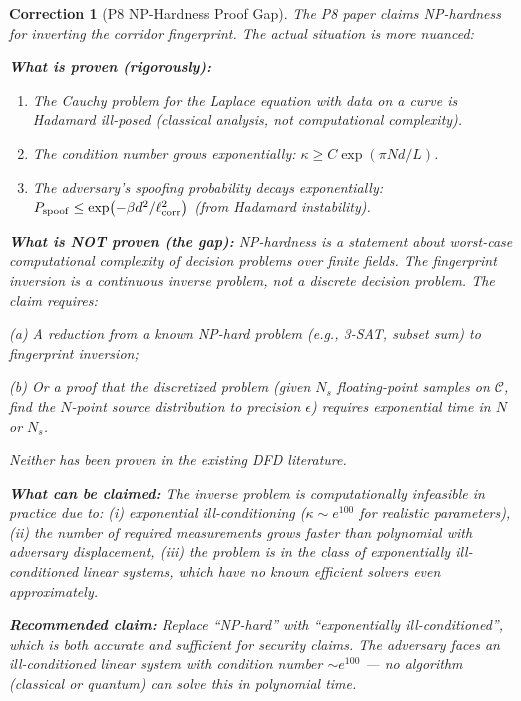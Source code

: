 \documentclass[aps,prd,twocolumn,superscriptaddress,nofootinbib]{revtex4-2}
\newtheorem{correction}{Correction}
\begin{document}
\begin{correction}[P8 NP-Hardness Proof Gap]
\label{cor:np_gap}
The P8 paper claims NP-hardness for inverting the corridor fingerprint.
The actual situation is more nuanced:

\textbf{What is proven (rigorously):}
\begin{enumerate}
\item The Cauchy problem for the Laplace equation with data on a curve is
Hadamard ill-posed (classical analysis, not computational complexity).
\item The condition number grows exponentially: $\kappa \geq C\exp(\pi Nd/L)$.
\item The adversary's spoofing probability decays exponentially:
$P_{\rm spoof} \leq \exp(-\beta d^2/\ell_{\rm corr}^2)$ (from Hadamard instability).
\end{enumerate}

\textbf{What is NOT proven (the gap):}
NP-hardness is a statement about \emph{worst-case computational complexity
of decision problems over finite fields}.  The fingerprint inversion is a
\emph{continuous inverse problem}, not a discrete decision problem.
The claim requires:

(a) A reduction from a known NP-hard problem (e.g., 3-SAT, subset sum) to
fingerprint inversion;

(b) Or a proof that the discretized problem (given $N_s$ floating-point
samples on $\mathcal{C}$, find the $N$-point source distribution to
precision $\epsilon$) requires exponential time in $N$ or $N_s$.

Neither has been proven in the existing DFD literature.

\textbf{What \emph{can} be claimed:}
The inverse problem is \emph{computationally infeasible in practice} due to:
(i) exponential ill-conditioning ($\kappa \sim e^{100}$ for realistic parameters),
(ii) the number of required measurements grows faster than polynomial with
adversary displacement,
(iii) the problem is in the class of \emph{exponentially ill-conditioned}
linear systems, which have no known efficient solvers even approximately.

\textbf{Recommended claim:} Replace ``NP-hard'' with ``exponentially
ill-conditioned'', which is both accurate and sufficient for security
claims.  The adversary faces an ill-conditioned linear system with
condition number $\sim e^{100}$ --- no algorithm (classical or quantum)
can solve this in polynomial time.
\end{correction}
\end{document}
